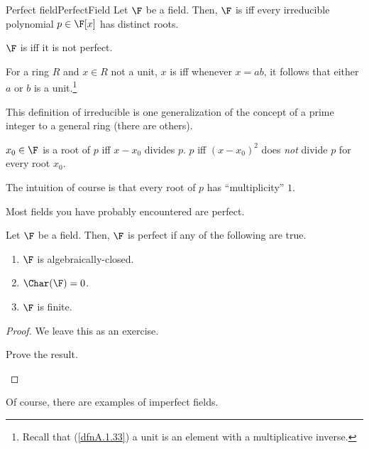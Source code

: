 \begin{dfn}{Perfect field}{PerfectField}
	Let $\F$ be a field.  Then, $\F$ is  iff every irreducible polynomial $p\in \F [x]$ has distinct roots.
	
	$\F$ is  iff it is not perfect.
	\begin{rmk}
		For a ring $R$ and $x\in R$ not a unit, $x$ is  iff whenever $x=ab$, it follows that either $a$ or $b$ is a unit.\footnote{Recall that (\cref{dfnA.1.33}) a unit is an element with a multiplicative inverse.}
		
		This definition of irreducible is one generalization of the concept of a prime integer to a general ring (there are others).
	\end{rmk}
	\begin{rmk}
		$x_0\in \F$ is a root of $p$ iff $x-x_0$ divides $p$.  $p$  iff $(x-x_0)^2$ does \emph{not} divide $p$ for every root $x_0$.
		
		The intuition of course is that every root of $p$ has ``multiplicity'' $1$.
	\end{rmk}
\end{dfn}
Most fields you have probably encountered are perfect.
\begin{prp}{}{}
	Let $\F$ be a field.  Then, $\F$ is perfect if any of the following are true.
	\begin{enumerate}
		\item $\F$ is algebraically-closed.
		\item $\Char (\F )=0$.
		\item $\F$ is finite.
	\end{enumerate}
	\begin{proof}
		We leave this as an exercise.
		\begin{exr}[breakable=false]{}{}
			Prove the result.
		\end{exr}
	\end{proof}
\end{prp}
Of course, there are examples of imperfect fields.
